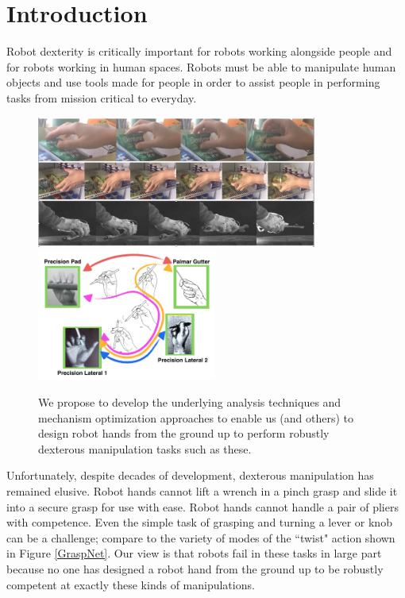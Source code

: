 \section{Introduction}

Robot dexterity is critically important for robots working alongside people and for robots working in human spaces.    Robots must be able to manipulate human objects and use tools made for people in order to assist people in performing tasks from mission critical to everyday.   

\begin{figure}
\begin{center}
{\includegraphics[height=1.7in]{./figs/acquireObject.png}}
{\includegraphics[height=1.7in]{./figs/smallGraspNet.png}}
\end{center}
\vspace*{-0.2in}
\caption[]{We propose to develop the underlying analysis techniques and mechanism optimization approaches to enable us (and others) to design  robot hands from the ground up to perform robustly dexterous manipulation tasks such as these.}
\label{DexterousExamples}
\end{figure}

Unfortunately, despite decades of development, dexterous manipulation has remained elusive.   Robot hands cannot lift a wrench in a pinch grasp and slide it into a secure grasp for use with ease.   Robot hands cannot handle a pair of pliers with competence.   Even the simple task of grasping and turning a lever or knob can be a challenge;   compare to the variety of modes of the ``twist" action shown in Figure \ref{GraspNet}.   Our view is that robots fail in these tasks in large part because no one has designed a robot hand from the ground up to be robustly competent at exactly these kinds of manipulations.

